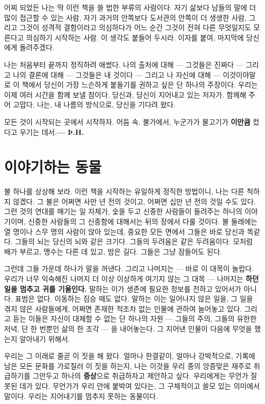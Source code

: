 어찌 되었든 나는 딱 이런 책을 쓸 법한 부류의 사람이다. 자기 삶보다 남들의 말에 더 많이 접근할 수 있는 사람, 자기 과거의 안쪽보다 도서관의 안쪽이 더 생생한 사람, 그리고 그것이 성격적 결함이라고 의심하다가 어느 순간 그것이 전혀 다른 무엇일지도 모른다고 의심하기 시작하는 사람. 이 생각도 붙들어 두시라. 이자를 붙여, 마지막에 당신에게 돌려주겠다.

나는 처음부터 끝까지 정직하려 애썼다. 나의 출처에 대해 — 그것들은 진짜다 — 그리고 나의 결론에 대해 — 그것들은 내 것이다 — 그리고 나 자신에 대해 — 이것이야말로 이 책에서 당신이 가장 느슨하게 붙들기를 권하고 싶은 단 하나의 주장이다. 우리는 이제 여러 시간을 함께 보낼 참이다. 당신과, 당신이 지어내고 있는 저자가. 함께해 주어 고맙다. 나는, 내 나름의 방식으로, 당신을 기다려 왔다.

모든 것이 시작되는 곳에서 시작하자. 어둠 속, 불가에서, 누군가가 물고기가 \textbf{이만큼} 컸다고 우기는 데서.\hfill\textbf{— Þ.H.}

\newpage
\renewcommand\contentsname{목 차}
\tableofcontents*

\chapter{이야기하는 동물}

불 하나를 상상해 보라. 이런 책을 시작하는 유일하게 정직한 방법이니, 나는 다른 척하지 않겠다. 그 불은 어쩌면 사만 년 전의 것이고, 어쩌면 십만 년 전의 것일 수도 있다. 그런 것의 연대를 매기는 일 자체가, 숯을 두고 신중한 사람들이 들려주는 하나의 이야기이며, 신중한 사람들의 그 신중함에 대해서는 뒤의 장에서 다룰 것이다. 불 둘레에는 열 명이나 스무 명의 사람이 앉아 있는데, 중요한 모든 면에서 그들은 바로 당신과 똑같다. 그들의 뇌는 당신의 뇌와 같은 크기다. 그들의 두려움은 같은 두려움이다. 모처럼 배가 부르고, 맹수는 다른 데 있고, 밤은 길다. 그들은 그냥 잠들어도 된다.

그런데 그들 가운데 하나가 말을 꺼낸다. 그리고 나머지는 — 바로 이 대목이 놀랍다. 우리가 너무 익숙해진 나머지 더 이상 이상하게 여기지 않는 그 대목 — 나머지는 \textbf{하던 일을 멈추고 귀를 기울인다.} 말하는 이가 생존에 필요한 정보를 전하고 있어서가 아니다. 표범은 없다. 이동하는 짐승 떼도 없다. 말하는 이는 일어나지 않은 일을, 그 일을 겪지 않은 사람들에게, 어쩌면 존재한 적조차 없는 인물에 관하여 늘어놓고 있다. 그리고 듣는 이들은 자신이 대체할 수 없는 단 하나의 자원 — 그들의 주의, 그들의 유한한 저녁, 단 한 번뿐인 삶의 한 조각 — 을 내어놓는다. 그 지어낸 인물이 다음에 무엇을 했는지 알아내기 위해서.

우리는 그 이래로 줄곧 이 짓을 해 왔다. 얼마나 한결같이, 얼마나 강박적으로, 기록에 남은 모든 문화를 가로질러 이 짓을 하는지, 나는 이것을 우리 종의 앙증맞은 재주로 취급하기를 그만두고 하나의 \textbf{증상}으로 취급하자고 제안하고 싶다. 우리에게는 무언가 잘못된 데가 있다. 무언가가 우리 안에 붙박여 있다는, 그 구체적이고 쓸모 있는 의미에서 말이다. 우리는 지어내기를 멈추지 못하는 동물이다.

